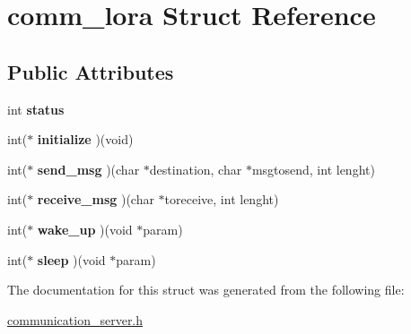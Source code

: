 \hypertarget{structcomm__lora}{}\section{comm\+\_\+lora Struct Reference}
\label{structcomm__lora}
\subsection*{Public Attributes}
\begin{DoxyCompactItemize}
\item 
int {\bfseries status}\hypertarget{structcomm__lora_af3d2758efaa7abdcd2cea6c42be1c8ff}{}\label{structcomm__lora_af3d2758efaa7abdcd2cea6c42be1c8ff}

\item 
int($\ast$ {\bfseries initialize} )(void)\hypertarget{structcomm__lora_a43201be81736361437ec4f0779c3c2d9}{}\label{structcomm__lora_a43201be81736361437ec4f0779c3c2d9}

\item 
int($\ast$ {\bfseries send\+\_\+msg} )(char $\ast$destination, char $\ast$msgtosend, int lenght)\hypertarget{structcomm__lora_aba814129304ed0327b7355454b0e2075}{}\label{structcomm__lora_aba814129304ed0327b7355454b0e2075}

\item 
int($\ast$ {\bfseries receive\+\_\+msg} )(char $\ast$toreceive, int lenght)\hypertarget{structcomm__lora_aeefb5262447899a3f477e237194a47bf}{}\label{structcomm__lora_aeefb5262447899a3f477e237194a47bf}

\item 
int($\ast$ {\bfseries wake\+\_\+up} )(void $\ast$param)\hypertarget{structcomm__lora_a90e60e01f94abbcf9c764fdd5d5726fd}{}\label{structcomm__lora_a90e60e01f94abbcf9c764fdd5d5726fd}

\item 
int($\ast$ {\bfseries sleep} )(void $\ast$param)\hypertarget{structcomm__lora_a1fd9c1720c2a32fdaf8987f846556494}{}\label{structcomm__lora_a1fd9c1720c2a32fdaf8987f846556494}

\end{DoxyCompactItemize}


The documentation for this struct was generated from the following file\+:\begin{DoxyCompactItemize}
\item 
\hyperlink{communication__server_8h}{communication\+\_\+server.\+h}\end{DoxyCompactItemize}
